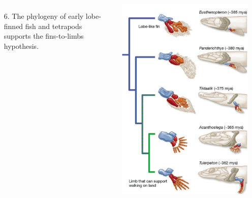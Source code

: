 \begin{frame}[t]
    \begin{adjustwidth}{-2em}{-1.5em}
        \begin{columns}
            
            \begin{itemize}
                \item[6.] The phylogeny of early lobe-finned fish and tetrapods
                    supports the fins-to-limbs hypothesis.
            \end{itemize}

            
            \vspace{-4mm}
            \includegraphics[height=\textheight]{early-tetrapod-limb-tree.png}

        \end{columns}
    \end{adjustwidth}
\end{frame}

